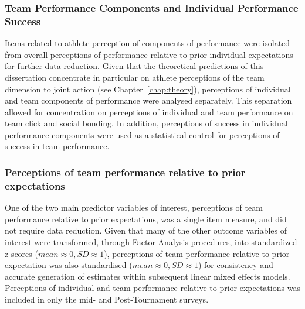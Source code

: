 \begin{CJK}{UTF8}{gbsn}
\subsubsection{Team Performance Components and Individual Performance Success}
Items related to athlete perception of components of performance were isolated from overall perceptions of performance relative to prior individual expectations for further data reduction. Given that the theoretical predictions of this dissertation concentrate in particular on athlete perceptions of the team dimension to joint action (see Chapter~\ref{chap:theory}), perceptions of individual and team components of performance were analysed separately.  This separation allowed for concentration on perceptions of individual and team performance on team click and social bonding. In addition, perceptions of success in individual performance components were used as a statistical control for perceptions of success in team performance.


\subsubsection{Perceptions of team performance relative to prior expectations}
One of the two main predictor variables of interest, perceptions of team performance relative to prior expectations, was a single item measure, and did not require data reduction.  Given that many of the other outcome variables of interest were transformed, through Factor Analysis procedures, into standardized z-scores ($mean \approx 0, SD \approx 1$), perceptions of team performance relative to prior expectation was also standardised ($mean \approx 0, SD \approx 1$) for consistency and accurate generation of estimates within subsequent linear mixed effects models.  Perceptions of individual and team performance relative to prior expectations was included in only the mid- and Post-Tournament surveys.
































\end{CJK}

